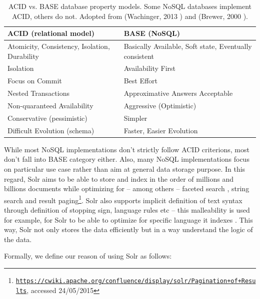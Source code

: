 \begin{table}[htbp]
\caption[ACID vs. BASE database property models.]{ACID vs. BASE database property models. Some NoSQL databases implement ACID, others do not. Adopted from (Wachinger, 2013 \citep{wachinger2013next}) and (Brewer, 2000 \citep{brewer2000towards}).}
\begin{tabularx}{\textwidth}{ | l | X | }
  \hline
  ACID (relational model) & BASE (NoSQL) \\
  \hline
  Atomicity, Consistency, Isolation, Durability & Basically Available, Soft state, Eventually consistent \\
  Isolation & Availability First \\
  Focus on Commit & Best Effort \\
  Nested Transactions & Approximative Answers Acceptable \\
  Non-quaranteed Availability & Aggressive (Optimistic) \\
  Conservative (pessimistic) & Simpler \\
  Difficult Evolution (schema) & Faster, Easier Evolution \\
  \hline
\end{tabularx}
  \label{fig:ACIDvsBASE}
\end{table}

While most NoSQL implementations don't strictly follow ACID criterions, most don't fall into BASE category either. Also, many NoSQL implementations focus on particular use case rather than aim at general data storage purpose. In this regard, Solr aims to be able to store and index in the order of millions and billions documents while optimizing for -- among others -- faceted search \citep{tunkelang2009faceted}, string search and result paging\footnote{\href{https://cwiki.apache.org/confluence/display/solr/Pagination+of+Results}{\texttt{https://cwiki.apache.org/confluence/display/solr/Pagination+of+Results}}, accessed 24/05/2015}. Solr also supports implicit definition of text syntax through definition of stopping sign, language rules etc -- this malleability is used for example, for Solr to be able to optimize for specific language it indexes \citep{grainger2014solr}. This way, Solr not only stores the data efficiently but in a way understand the logic of the data.

Formally, we define our reason of using Solr as follows:

